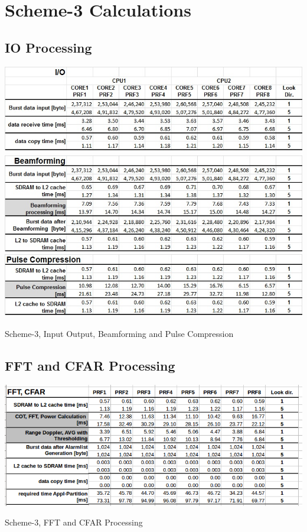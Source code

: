 \chapter{Scheme-3 Calculations}
\label{app:sch3:calc}

\section{IO Processing}
\begin{table}[h!]
	\centering
	\includegraphics[width=140mm]{figures/scheme4_io}
	\includegraphics[width=140mm]{figures/scheme4_bf}
	\includegraphics[width=140mm]{figures/scheme4_pc}
	\caption{Scheme-3, Input Output, Beamforming and Pulse Compression}
	\label{fig:mm:scheme4_io}
\end{table}

\section{FFT and CFAR Processing}
\begin{table}[h!]
	\centering
	\includegraphics[width=140mm]{figures/scheme4_fft}
	\caption{Scheme-3, FFT and CFAR Processing}
	\label{fig:mm:scheme4_fft}
\end{table}
\FloatBarrier

